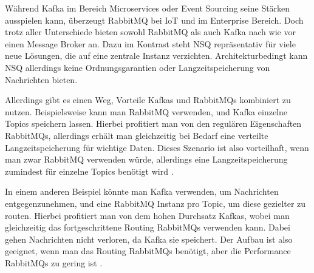 Während Kafka im Bereich Microservices oder Event Sourcing seine Stärken
ausspielen kann, überzeugt RabbitMQ bei IoT und im Enterprise Bereich.
Doch trotz aller Unterschiede bieten sowohl RabbitMQ als auch Kafka nach wie
vor einen Message Broker an. Dazu im Kontrast steht NSQ repräsentativ für viele
neue Lösungen, die auf eine zentrale Instanz verzichten.
Architekturbedingt kann NSQ allerdings keine Ordnungsgarantien oder
Langzeitspeicherung von Nachrichten bieten. \cite{RabbitMQBenchmark:online, Linkedin:online}

Allerdings gibt es einen Weg, Vorteile Kafkas und RabbitMQs kombiniert zu nutzen.
Beispielsweise kann man RabbitMQ verwenden, und Kafka einzelne Topics speichern
lassen. Hierbei profitiert man von den regulären Eigenschaften RabbitMQs,
allerdings erhält man gleichzeitig bei Bedarf eine verteilte Langzeitspeicherung
für wichtige Daten. Dieses Szenario ist also vorteilhaft, wenn man zwar RabbitMQ
verwenden würde, allerdings eine Langzeitspeicherung zumindest für einzelne Topics
benötigt wird \cite{dobbelaere2017kafka}.

In einem anderen Beispiel könnte man Kafka verwenden, um Nachrichten
entgegenzunehmen, und eine RabbitMQ Instanz pro Topic, um diese gezielter zu
routen. Hierbei profitiert man von dem hohen Durchsatz Kafkas, wobei man
gleichzeitig das fortgeschrittene Routing RabbitMQs verwenden kann. Dabei gehen
Nachrichten nicht verloren, da Kafka sie speichert. Der Aufbau ist also
geeignet, wenn man das Routing RabbitMQs benötigt, aber die Performance
RabbitMQs zu gering ist \cite{dobbelaere2017kafka}.

\newcommand*\rot{\rotatebox{270}}

